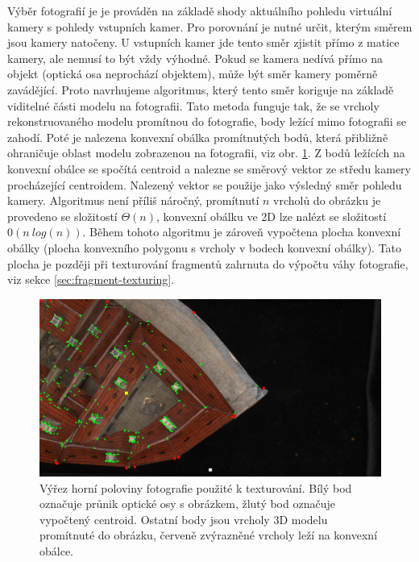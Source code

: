 \documentclass[11pt,twoside,a4paper]{book}
\begin{document}
Výběr fotografií je je prováděn na základě shody aktuálního pohledu virtuální kamery s pohledy vstupních kamer. Pro porovnání je nutné určit, kterým směrem jsou kamery natočeny.  U vstupních kamer jde tento směr zjistit přímo z matice kamery, ale nemusí to být vždy výhodné. Pokud se kamera nedívá přímo na objekt (optická osa neprochází objektem), může být směr kamery poměrně zavádějící. Proto navrhujeme algoritmus, který tento směr koriguje na základě viditelné části modelu na fotografii. Tato metoda funguje tak, že se vrcholy rekonstruovaného modelu promítnou do fotografie, body ležící mimo fotografii se zahodí. Poté je nalezena konvexní obálka \cite{Andrew79} promítnutých bodů, která přibližně ohraničuje oblast modelu zobrazenou na fotografii, viz obr. \ref{fig:convex-hull}. Z bodů ležících na konvexní obálce se spočítá centroid a nalezne se směrový vektor ze středu kamery procházející centroidem. Nalezený vektor se použije jako výsledný směr pohledu kamery. Algoritmus není příliš náročný, promítnutí $n$ vrcholů do obrázku je provedeno se složitostí $\Theta(n)$, konvexní obálku ve 2D lze nalézt se složitostí $0(n~log(n))$. Během tohoto algoritmu je zároveň vypočtena plocha konvexní obálky (plocha konvexního polygonu s vrcholy v bodech konvexní obálky). Tato plocha je později při texturování fragmentů zahrnuta do výpočtu váhy fotografie, viz sekce \ref{sec:fragment-texturing}.

\begin{figure}[th]
\begin{center}
\includegraphics[width=\textwidth]{figures/0-0270_1020_110_09_00_000_098345e}
\caption{Výřez horní poloviny fotografie použité k texturování. Bílý bod označuje průnik optické osy s obrázkem, žlutý bod označuje vypočtený centroid. Ostatní body jsou vrcholy 3D modelu promítnuté do obrázku, červeně zvýrazněné vrcholy leží na konvexní obálce.}
\label{fig:convex-hull}
\end{center}
\end{figure}
 
\end{document}
